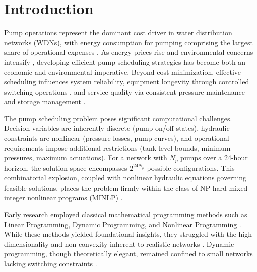 \documentclass[a4paper,fleqn]{cas-dc}
\begin{document}
\maketitle

\section{Introduction}

Pump operations represent the dominant cost driver in water distribution networks (WDNs), with energy consumption for pumping comprising the largest share of operational expenses \cite{Paola2024}. As energy prices rise and environmental concerns intensify \cite{Reis2023}, developing efficient pump scheduling strategies has become both an economic and environmental imperative. Beyond cost minimization, effective scheduling influences system reliability, equipment longevity through controlled switching operations \cite{Lansey1994,Costa2016}, and service quality via consistent pressure maintenance and storage management \cite{Reis2023}.

The pump scheduling problem poses significant computational challenges. Decision variables are inherently discrete (pump on/off states), hydraulic constraints are nonlinear (pressure losses, pump curves), and operational requirements impose additional restrictions (tank level bounds, minimum pressures, maximum actuations). For a network with $N_p$ pumps over a 24-hour horizon, the solution space encompasses $2^{24 N_p}$ possible configurations. This combinatorial explosion, coupled with nonlinear hydraulic equations governing feasible solutions, places the problem firmly within the class of NP-hard mixed-integer nonlinear programs (MINLP) \cite{Fooladivanda2018,Verleye2016}.

Early research employed classical mathematical programming methods such as Linear Programming, Dynamic Programming, and Nonlinear Programming \cite{Brion1991,Jowitt1992}. While these methods yielded foundational insights, they struggled with the high dimensionality and non-convexity inherent to realistic networks \cite{Candelieri2018,Reis2023}. Dynamic programming, though theoretically elegant, remained confined to small networks lacking switching constraints \cite{Lansey1994}.
\end{document}
